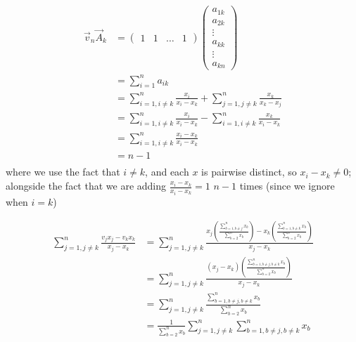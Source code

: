 \documentclass{exam}
\begin{document}
\begin{align*}
    \vec{v}_n\vec{A}_k &= \begin{pmatrix}1 & 1 & \ldots & 1 \end{pmatrix} 
    \begin{pmatrix}
   a_{1k} \\
   a_{2k} \\
   \vdots \\
   a_{kk} \\
   \vdots \\
   a_{kn}
   \end{pmatrix}
   \\
   &= \sum_{i = 1}^n a_{ik} \\
   &= \sum_{i = 1, i \neq k}^n \frac{x_i}{x_i - x_k} + \sum_{j = 1, j \neq k}^n\frac{x_k}{x_k - x_j} \\
   &= \sum_{i = 1, i \neq k}^n \frac{x_i}{x_i - x_k} - \sum_{i = 1, i \neq k}^n\frac{x_k}{x_i - x_k} \\
   &= \sum_{i = 1, i \neq k}^n \frac{x_i - x_k}{x_i - x_k}  \\
   &= n-1  \\
\end{align*}
where we use the fact that $i \neq k$, and each $x$ is pairwise distinct, so $x_i - x_k \neq 0$; alongside the fact that we are adding $\frac{x_i - x_k}{x_i - x_k} = 1$ $n - 1$ times (since we ignore when $i = k$)

\begin{align*}
    \sum_{j = 1, j \neq k}^n \frac{v_jx_j - v_kx_k}{x_j - x_k} &= \sum_{j = 1, j \neq k}^n \frac{x_j\left(\frac{\sum_{b = 1, b \neq j}^n x_b}{\sum_{b = 2}^n x_b}\right) - x_k\left(\frac{\sum_{b = 1, b \neq k}^n x_b}{\sum_{b = 2}^n x_b}\right)}{x_j - x_k} \\
    &= \sum_{j = 1, j \neq k}^n \frac{(x_j - x_k)\left(\frac{\sum_{b = 1, b \neq j, b \neq k}^n x_b}{\sum_{b = 2}^n x_b}\right)}{x_j - x_k} \\
    &= \sum_{j = 1, j \neq k}^n \frac{\sum_{b = 1, b \neq j, b \neq k}^n x_b}{\sum_{b = 2}^n x_b} \\
    &= \frac{1}{\sum_{b = 2}^n x_b}\sum_{j = 1, j \neq k}^n \sum_{b = 1, b \neq j, b \neq k}^n x_b \\
\end{align*}
\end{document}
